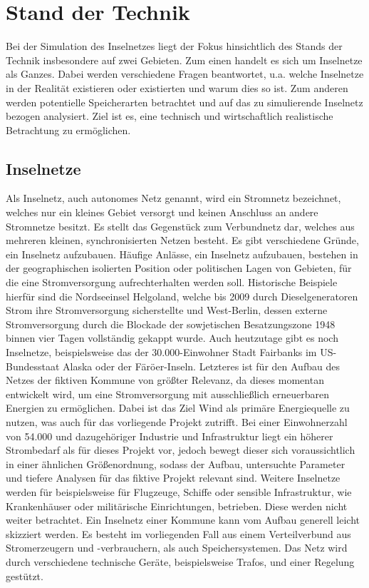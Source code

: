 \chapter{Stand der Technik}

Bei der Simulation des Inselnetzes liegt der Fokus hinsichtlich des Stands der Technik insbesondere auf zwei Gebieten. Zum einen handelt es sich um Inselnetze als Ganzes. Dabei werden verschiedene Fragen beantwortet, u.a. welche Inselnetze in der Realität existieren oder existierten und warum dies so ist. Zum anderen werden potentielle Speicherarten betrachtet und auf das zu simulierende Inselnetz bezogen analysiert. Ziel ist es, eine technisch und wirtschaftlich realistische Betrachtung zu ermöglichen.

\section{Inselnetze}

Als Inselnetz, auch autonomes Netz genannt, wird ein Stromnetz bezeichnet, welches nur ein kleines Gebiet versorgt und keinen Anschluss an andere Stromnetze besitzt. Es stellt das Gegenstück zum Verbundnetz dar, welches aus mehreren kleinen, synchronisierten Netzen besteht\cite{energielexikon}. 
Es gibt verschiedene Gründe, ein Inselnetz aufzubauen. Häufige Anlässe, ein Inselnetz aufzubauen, bestehen in der geographischen isolierten Position oder politischen Lagen von Gebieten, für die eine Stromversorgung aufrechterhalten werden soll. Historische Beispiele hierfür sind die Nordseeinsel Helgoland, welche bis 2009 durch Dieselgeneratoren Strom ihre Stromversorgung sicherstellte\cite{merkur} und West-Berlin, dessen externe Stromversorgung durch die Blockade der sowjetischen Besatzungszone 1948 binnen vier Tagen vollständig gekappt wurde\cite{berlinstreet}. Auch heutzutage gibt es noch Inselnetze, beispielsweise das der 30.000-Einwohner Stadt Fairbanks im US-Bundesstaat Alaska\cite{iseralaska} oder der Färöer-Inseln\cite{cigre-article}. Letzteres ist für den Aufbau des Netzes der fiktiven Kommune von größter Relevanz, da dieses momentan entwickelt wird, um eine Stromversorgung mit ausschließlich erneuerbaren Energien zu ermöglichen\cite{trondheim-thesis}. Dabei ist das Ziel Wind als primäre Energiequelle zu nutzen, was auch für das vorliegende Projekt zutrifft. Bei einer Einwohnerzahl von 54.000\cite{statista-population} und dazugehöriger Industrie und Infrastruktur liegt ein höherer Strombedarf als für dieses Projekt vor, jedoch bewegt dieser sich voraussichtlich in einer ähnlichen Größenordnung, sodass der Aufbau, untersuchte Parameter und tiefere Analysen für das fiktive Projekt relevant sind.
Weitere Inselnetze werden für beispielsweise für Flugzeuge, Schiffe oder sensible Infrastruktur, wie Krankenhäuser oder militärische Einrichtungen, betrieben. Diese werden nicht weiter betrachtet.
Ein Inselnetz einer Kommune kann vom Aufbau generell leicht skizziert werden. Es besteht im vorliegenden Fall aus einem Verteilverbund  aus Stromerzeugern und -verbrauchern, als auch Speichersystemen. Das Netz wird durch verschiedene technische Geräte, beispielsweise Trafos, und einer Regelung gestützt. 

